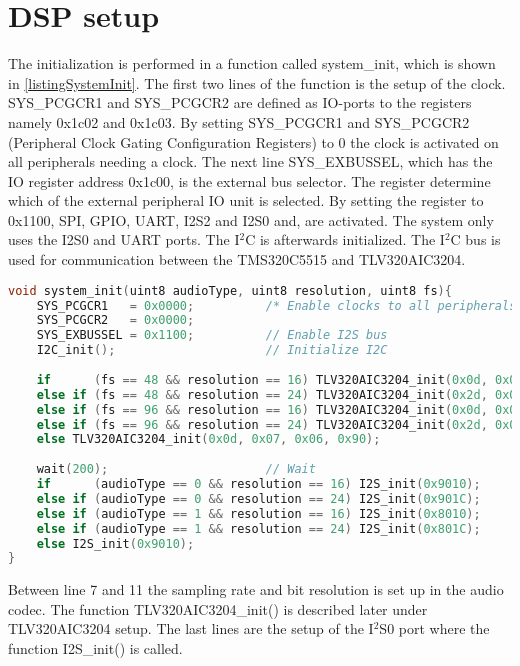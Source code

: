 \chapter{DSP setup} \label{app:DSPSetup}

The initialization is performed in a function called system\_init, which is shown in \autoref{listingSystemInit}. The first two lines of the function is the setup of the clock. SYS\_PCGCR1 and SYS\_PCGCR2 are defined as IO-ports to the registers namely 0x1c02 and 0x1c03. By setting SYS\_PCGCR1 and SYS\_PCGCR2 (Peripheral Clock Gating Configuration Registers) to 0 the clock is activated on all peripherals needing a clock. The next line SYS\_EXBUSSEL, which has the IO register address 0x1c00, is the external bus selector. The register determine which of the external peripheral IO unit is selected. By setting the register to 0x1100, SPI, GPIO, UART, I2S2 and I2S0 and, are activated. The system only uses the I2S0 and UART ports. The I$^2$C is afterwards initialized. The I$^2$C bus is used for communication between the TMS320C5515 and TLV320AIC3204.

\begin{lstlisting}[language=C, caption = {System initialization},label={listingSystemInit}]
void system_init(uint8 audioType, uint8 resolution, uint8 fs){
    SYS_PCGCR1 	 = 0x0000;     		/* Enable clocks to all peripherals */
    SYS_PCGCR2 	 = 0x0000;
	SYS_EXBUSSEL = 0x1100;         	// Enable I2S bus
	I2C_init();        				// Initialize I2C
	
	if 		(fs == 48 && resolution == 16) TLV320AIC3204_init(0x0d, 0x07, 0x06, 0x90);
	else if (fs == 48 && resolution == 24) TLV320AIC3204_init(0x2d, 0x07, 0x06, 0x90);	
	else if (fs == 96 && resolution == 16) TLV320AIC3204_init(0x0d, 0x0E, 0x0D, 0x20);	
	else if	(fs == 96 && resolution == 24) TLV320AIC3204_init(0x2d, 0x0E, 0x0D, 0x20);
	else TLV320AIC3204_init(0x0d, 0x07, 0x06, 0x90);	
	
	wait(200);        				// Wait	
	if 		(audioType == 0 && resolution == 16) I2S_init(0x9010);
	else if (audioType == 0 && resolution == 24) I2S_init(0x901C);	
	else if (audioType == 1 && resolution == 16) I2S_init(0x8010);	
	else if	(audioType == 1 && resolution == 24) I2S_init(0x801C);
	else I2S_init(0x9010);
}
\end{lstlisting}
Between line 7 and 11 the sampling rate and bit resolution is set up in the audio codec. The function TLV320AIC3204\_init() is described later under TLV320AIC3204 setup. The last lines are the setup of the I$^2$S0 port where the function I2S\_init() is called.

